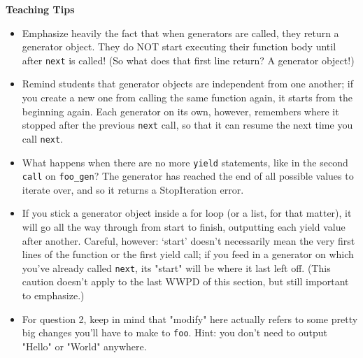 \begin{blocksection}
\begin{guide}
\textbf{Teaching Tips}
\begin{itemize}
\item Emphasize heavily the fact that when generators are called, they return a generator object. They do NOT start executing their function body until after \texttt{next} is called! (So what does that first line return? A generator object!)
\item Remind students that generator objects are independent from one another; if you create a new one from calling the same function again, it starts from the beginning again. Each generator on its own, however, remembers where it stopped after the previous \texttt{next} call, so that it can resume the next time you call \texttt{next}.
\item What happens when there are no more \texttt{yield} statements, like in the second \texttt{call} on \texttt{foo\_gen}? The generator has reached the end of all possible values to iterate over, and so it returns a StopIteration error.
\item If you stick a generator object inside a for loop (or a list, for that matter), it will go all the way through from start to finish, outputting each yield value after another. Careful, however: `start' doesn't necessarily mean the very first lines of the function or the first yield call; if you feed in a generator on which you've already called \texttt{next}, its "start" will be where it last left off. (This caution doesn't apply to the last WWPD of this section, but still important to emphasize.)
\item For question 2, keep in mind that "modify" here actually refers to some pretty big changes you'll have to make to \texttt{foo}. Hint: you don't need to output "Hello" or "World" anywhere.
\end{itemize}
\end{guide}
\end{blocksection}
